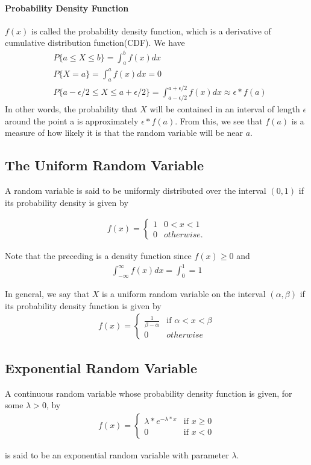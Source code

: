 \documentclass[10 pt,final]{article}
\newcommand{\impo}[1]{{\color{magenta} #1}}
\begin{document}
\paragraph{Probability Density Function} $f(x)$ is called the probability density function, which is a derivative of cumulative distribution function(CDF). We have
\begin{align*}
& P\{a \leq X \leq b\} = \int_{a}^{b} f(x)dx \\
& P\{X=a\} = \int_a^a f(x)dx = 0 \\
& P\{a -\epsilon/2 \leq X \leq a+\epsilon/2\} = \int_{a-\epsilon/2}^{a+\epsilon/2} f(x)dx \approx \epsilon*f(a)
\end{align*}
In other words, the probability that \impo{$X$ will be contained in an interval of length $\epsilon$} around the point a is approximately $\epsilon *f(a)$. From this, we see that \impo{ $f(a)$ is a measure of how likely it is that the random variable will be near $a$}.


\subsection{The Uniform Random Variable}
A random variable is said to be \impo{uniformly distributed} over the interval $(0,1)$ if its probability density is given by

\begin{align*}
f(x) =
\begin{cases}
1 &0 < x < 1\\ 
0 &otherwise.
\end{cases}
\end{align*}

Note that the preceding is a density function since $f(x) \geq 0$ and
\begin{align*}
\int_{-\infty}^{\infty} f(x)dx = \int_0^1 = 1
\end{align*}

In general, we say that $X$ is a uniform random variable on the interval $(\alpha, \beta)$ if its probability density function is given by
\begin{align*}
f(x) =
\begin{cases}
\frac{1}{\beta - \alpha} & \mbox{if } \alpha < x < \beta \\
0 & otherwise
\end{cases}
\end{align*}


\subsection{Exponential Random Variable}
A continuous random variable whose probability density function is given, for some $\lambda > 0$, by
\begin{align*}
f(x) =
\begin{cases}
\lambda * e^{-\lambda*x} & \mbox{if } x \ge 0 \\
0 & \mbox{if } x <0
\end{cases}
\end{align*}

is said to be an \impo{exponential random variable} with parameter $\lambda$.
\end{document}
